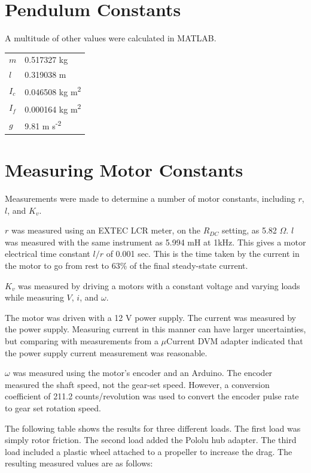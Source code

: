 \documentclass[12pt,letterpaper]{article}
\begin{document}
\begin{appendices}
\section{Pendulum Constants}
A multitude of other values were calculated in MATLAB.  \\

\begin{tabular}{l l}
$m$ & 0.517327 kg \\
$l$ & 0.319038 m \\
$I_{c}$ & 0.046508 kg m\textsuperscript{2} \\
$I_{f}$ & 0.000164 kg m\textsuperscript{2} \\
$g$ & 9.81 m s\textsuperscript{-2} \\
\end{tabular}




\section{Measuring Motor Constants}
\label{appendix:measure}
Measurements were made to determine a number of motor constants, including $r$, $l$, and $K_{v}$.  

$r$ was measured using an EXTEC LCR meter, on the $R_{DC}$ setting, as 5.82 $\Omega$. $l$ was 
measured with the same instrument as 5.994 mH at 1kHz.  This gives a motor electrical time constant $l/r$ of 0.001 sec.  This is the time taken by the current in the motor to go from rest to 63\% of the final steady-state current.

$K_{v}$ was measured by driving a motors with a constant voltage and
varying loads while measuring $V$, $i$, and $\omega$.  


The motor was driven with a 12 V power supply.  The current was measured by the power supply.  Measuring current in this manner can have larger uncertainties, but comparing with measurements from a $\mu$Current DVM adapter indicated that the power supply current measurement was reasonable.  


$\omega$ was measured using the motor's encoder and an Arduino.  The encoder measured the shaft speed, not the gear-set speed.  However, a conversion coefficient of 211.2 counts/revolution was used to convert the encoder pulse rate to gear set rotation speed.

The following table shows the results for three different loads.  The first load was simply rotor friction.  The second load added the Pololu hub adapter.  The third load included a plastic wheel attached to a propeller to increase the drag.
The resulting measured values are as follows: \\


\end{appendices}
\end{document}
